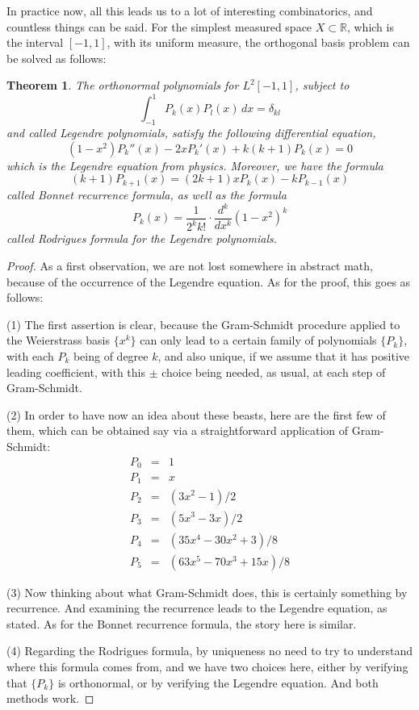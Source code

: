 \documentclass[12pt]{amsbook}
\newtheorem{theorem}{Theorem}[chapter]
\begin{document}
In practice now, all this leads us to a lot of interesting combinatorics, and countless things can be said. For the simplest measured space $X\subset\mathbb R$, which is the interval $[-1,1]$, with its uniform measure, the orthogonal basis problem can be solved as follows:


\begin{theorem}
The orthonormal polynomials for $L^2[-1,1]$, subject to
$$\int_{-1}^1P_k(x)P_l(x)\,dx=\delta_{kl}$$
and called Legendre polynomials, satisfy the following differential equation,
$$(1-x^2)P_k''(x)-2xP_k'(x)+k(k+1)P_k(x)=0$$
which is the Legendre equation from physics. Moreover, we have the formula
$$(k+1)P_{k+1}(x)=(2k+1)xP_k(x)-kP_{k-1}(x)$$
called Bonnet recurrence formula, as well as the formula
$$P_k(x)=\frac{1}{2^kk!}\cdot\frac{d^k}{dx^k}\left(1-x^2\right)^k$$
called Rodrigues formula for the Legendre polynomials.
\end{theorem}

\begin{proof}
As a first observation, we are not lost somewhere in abstract math, because of the occurrence of the Legendre equation. As for the proof, this goes as follows:

\medskip

(1) The first assertion is clear, because the Gram-Schmidt procedure applied to the Weierstrass basis $\{x^k\}$ can only lead to a certain family of polynomials $\{P_k\}$, with each $P_k$ being of degree $k$, and also unique, if we assume that it has positive leading coefficient, with this $\pm$ choice being needed, as usual, at each step of Gram-Schmidt.

\medskip

(2) In order to have now an idea about these beasts, here are the first few of them, which can be obtained say via a straightforward application of Gram-Schmidt:
\begin{eqnarray*}
P_0&=&1\\
P_1&=&x\\
P_2&=&(3x^2-1)/2\\
P_3&=&(5x^3-3x)/2\\
P_4&=&(35x^4-30x^2+3)/8\\
P_5&=&(63x^5-70x^3+15x)/8
\end{eqnarray*}

(3) Now thinking about what Gram-Schmidt does, this is certainly something by recurrence. And examining the recurrence leads to the Legendre equation, as stated. As for the Bonnet recurrence formula, the story here is similar.

\medskip

(4) Regarding the Rodrigues formula, by uniqueness no need to try to understand where this formula comes from, and we have two choices here, either by verifying that $\{P_k\}$ is orthonormal, or by verifying the Legendre equation. And both methods work.
\end{proof}
\end{document}
